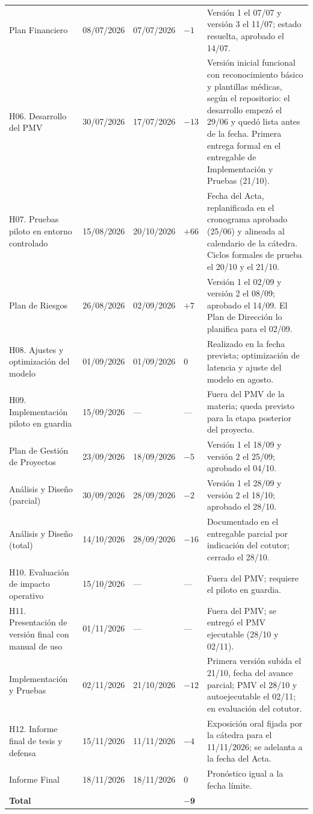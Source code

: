 {\begin{longtable}{@{}p{3.4cm}p{1.85cm}p{1.85cm}p{1.35cm}p{5.7cm}@{}}
Plan Financiero & 08/07/2026 & 07/07/2026 & $-1$ & Versión 1 el 07/07 y versión 3 el 11/07; estado resuelta, aprobado el 14/07. \\
H06. Desarrollo del PMV & 30/07/2026 & 17/07/2026 & $-13$ & Versión inicial funcional con reconocimiento básico y plantillas médicas, según el repositorio: el desarrollo empezó el 29/06 y quedó lista antes de la fecha. Primera entrega formal en el entregable de Implementación y Pruebas (21/10). \\
H07. Pruebas piloto en entorno controlado & 15/08/2026 & 20/10/2026 & $+66$ & Fecha del Acta, replanificada en el cronograma aprobado (25/06) y alineada al calendario de la cátedra. Ciclos formales de prueba el 20/10 y el 21/10. \\
Plan de Riesgos & 26/08/2026 & 02/09/2026 & $+7$ & Versión 1 el 02/09 y versión 2 el 08/09; aprobado el 14/09. El Plan de Dirección lo planifica para el 02/09. \\
H08. Ajustes y optimización del modelo & 01/09/2026 & 01/09/2026 & 0 & Realizado en la fecha prevista; optimización de latencia y ajuste del modelo en agosto. \\
H09. Implementación piloto en guardia & 15/09/2026 & --- & --- & Fuera del PMV de la materia; queda previsto para la etapa posterior del proyecto. \\
Plan de Gestión de Proyectos & 23/09/2026 & 18/09/2026 & $-5$ & Versión 1 el 18/09 y versión 2 el 25/09; aprobado el 04/10. \\
Análisis y Diseño (parcial) & 30/09/2026 & 28/09/2026 & $-2$ & Versión 1 el 28/09 y versión 2 el 18/10; aprobado el 28/10. \\
Análisis y Diseño (total) & 14/10/2026 & 28/09/2026 & $-16$ & Documentado en el entregable parcial por indicación del cotutor; cerrado el 28/10. \\
H10. Evaluación de impacto operativo & 15/10/2026 & --- & --- & Fuera del PMV; requiere el piloto en guardia. \\
H11. Presentación de versión final con manual de uso & 01/11/2026 & --- & --- & Fuera del PMV; se entregó el PMV ejecutable (28/10 y 02/11). \\
Implementación y Pruebas & 02/11/2026 & 21/10/2026 & $-12$ & Primera versión subida el 21/10, fecha del avance parcial; PMV el 28/10 y autoejecutable el 02/11; en evaluación del cotutor. \\
H12. Informe final de tesis y defensa & 15/11/2026 & 11/11/2026 & $-4$ & Exposición oral fijada por la cátedra para el 11/11/2026; se adelanta a la fecha del Acta. \\
Informe Final & 18/11/2026 & 18/11/2026 & 0 & Pronóstico igual a la fecha límite. \\
\midrule
\textbf{Total} & & & $\mathbf{-9}$ & \\
\end{longtable}
}

